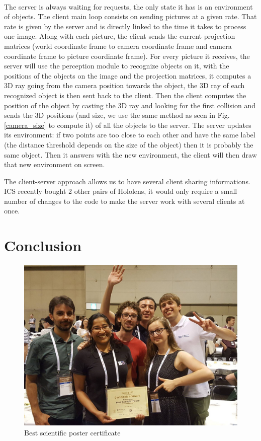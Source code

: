 \documentclass[a4paper, twocolumn]{article}
\begin{document}
    \paragraph{}
    The server is always waiting for requests, the only state it has is an environment of objects.
    The client main loop consists on sending pictures at a given rate. That rate is given by the server and is directly linked to the time it takes to process one image. Along with each picture, the client sends the current projection matrices (world coordinate frame to camera coordinate frame and camera coordinate frame to picture coordinate frame). For every picture it receives, the server will use the perception module to recognize objects on it, with the positions of the objects on the image and the projection matrices, it computes a 3D ray going from the camera position towards the object, the 3D ray of each recognized object is then sent back to the client. Then the client computes the position of the object by casting the 3D ray and looking for the first collision and sends the 3D positions (and size, we use the same method as seen in Fig. \ref{camera_size} to compute it) of all the objects to the server. The server updates its environment: if two points are too close to each other and have the same label (the distance threshold depends on the size of the object) then it is probably the same object. Then it answers with the new environment, the client will then draw that new environment on screen.
    
    The client-server approach allows us to have several client sharing informations. ICS recently bought 2 other pairs of Hololens, it would only require a small number of changes to the code to make the server work with several clients at once.
    
    

    \section*{Conclusion}

    \begin{figure}[!b]
        \includegraphics[width=\columnwidth]{../img/certificate.jpg}
        \caption{Best scientific poster certificate}
        \label{certificate}
    \end{figure}
\end{document}
